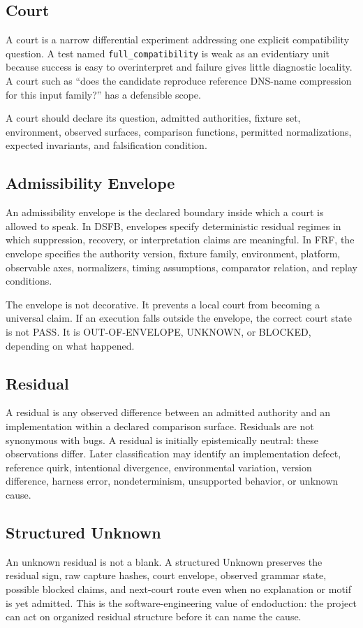 \documentclass[11pt,a4paper]{article}
\newcommand{\frf}{\textsc{FRF}}
\newcommand{\dsfb}{\textsc{DSFB}}
\begin{document}
\subsection{Court}
A court is a narrow differential experiment addressing one explicit compatibility question. A test named \texttt{full\_compatibility} is weak as an evidentiary unit because success is easy to overinterpret and failure gives little diagnostic locality. A court such as ``does the candidate reproduce reference DNS-name compression for this input family?'' has a defensible scope.

A court should declare its question, admitted authorities, fixture set, environment, observed surfaces, comparison functions, permitted normalizations, expected invariants, and falsification condition.

\subsection{Admissibility Envelope}
An admissibility envelope is the declared boundary inside which a court is allowed to speak. In \dsfb{}, envelopes specify deterministic residual regimes in which suppression, recovery, or interpretation claims are meaningful. In \frf{}, the envelope specifies the authority version, fixture family, environment, platform, observable axes, normalizers, timing assumptions, comparator relation, and replay conditions.

The envelope is not decorative. It prevents a local court from becoming a universal claim. If an execution falls outside the envelope, the correct court state is not PASS. It is OUT-OF-ENVELOPE, UNKNOWN, or BLOCKED, depending on what happened.

\subsection{Residual}
A residual is any observed difference between an admitted authority and an implementation within a declared comparison surface. Residuals are not synonymous with bugs. A residual is initially epistemically neutral: these observations differ. Later classification may identify an implementation defect, reference quirk, intentional divergence, environmental variation, version difference, harness error, nondeterminism, unsupported behavior, or unknown cause.

\subsection{Structured Unknown}
An unknown residual is not a blank. A structured Unknown preserves the residual sign, raw capture hashes, court envelope, observed grammar state, possible blocked claims, and next-court route even when no explanation or motif is yet admitted. This is the software-engineering value of endoduction: the project can act on organized residual structure before it can name the cause.
\end{document}
